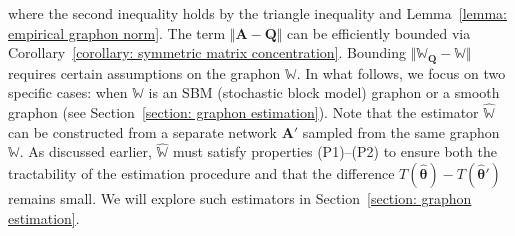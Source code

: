 \documentclass[11pt]{article}
\newcommand{\bA}{\bm{A}}
\newcommand{\bQ}{\bm{Q}}
\newcommand{\<}{\langle}
\renewcommand{\>}{\rangle}
\theoremstyle{plain}
\theoremstyle{definition}
\theoremstyle{remark}
\begin{document}
where the second inequality holds by the triangle inequality and Lemma~\ref{lemma: empirical graphon norm}.
The term $\Vert \bA - \bQ \Vert$ can be efficiently bounded via Corollary~\ref{corollary: symmetric matrix concentration}. Bounding \( \Vert \mathbb{W}_{\mathbf{Q}} - \mathbb{W} \Vert \) requires certain assumptions on the graphon \( \mathbb{W} \). In what follows, we focus on two specific cases: when \( \mathbb{W} \) is an SBM (stochastic block model) graphon or a smooth graphon (see Section~\ref{section: graphon estimation}).  
 Note that the estimator \( \widehat{\mathbb{W}} \) can be constructed from a separate network \( \mathbf{A}' \) sampled from the same graphon \( \mathbb{W} \). As discussed earlier, \( \widehat{\mathbb{W}} \) must satisfy properties (P1)–(P2) to ensure both the tractability of the estimation procedure and that the difference \( T(\widehat{\boldsymbol{\theta}}) - T(\widehat{\boldsymbol{\theta}}') \) remains small. We will explore such estimators in Section~\ref{section: graphon estimation}.  
\end{document}
